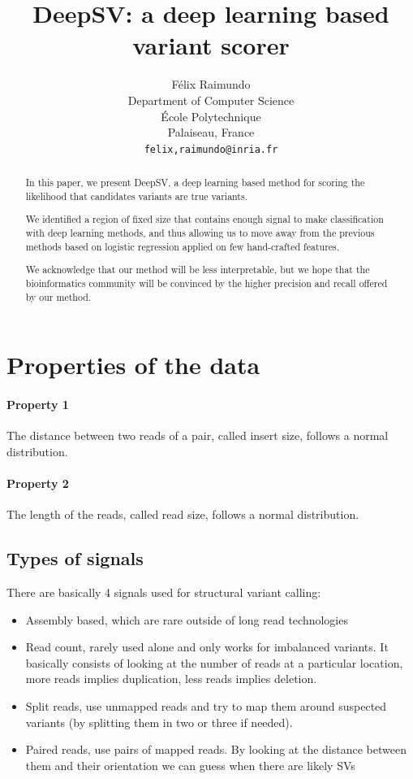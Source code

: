 \documentclass{article}
\title{DeepSV: a deep learning based variant scorer}
\author{
  Félix Raimundo\\
  Department of Computer Science\\
  École Polytechnique\\
  Palaiseau, France\\
  \texttt{felix,raimundo@inria.fr}
}
\begin{document}
\maketitle

\begin{abstract}
  In this paper, we present DeepSV, a deep learning based method for scoring the likelihood that candidates variants are true variants.
  
  We identified a region of fixed size that contains enough signal to make classification
  with deep learning methods, and thus allowing us to move away from the previous methods
  based on logistic regression applied on few hand-crafted features.
  
  We acknowledge that our method will be less interpretable, but we hope that the bioinformatics community will be convinced by the higher precision and recall offered by our method. 
\end{abstract}

\section{Properties of the data}

\paragraph{Property 1} The distance between two reads of a pair, called insert size, follows a normal distribution.
\paragraph{Property 2} The length of the reads, called read size, follows a normal distribution.


\subsection{Types of signals}

There are basically 4 signals used for structural variant calling:

\begin{itemize}
	\item Assembly based, which are rare outside of long read technologies
	\item Read count, rarely used alone and only works for imbalanced variants. It basically consists
of looking at the number of reads at a particular location, more reads implies duplication, less
reads implies deletion.
	\item Split reads, use unmapped reads and try to map them around suspected variants (by splitting them
in two or three if needed).
	\item Paired reads, use pairs of mapped reads. By looking at the distance between them and their
orientation we can guess when there are likely SVs
\end{itemize}
\end{document}
